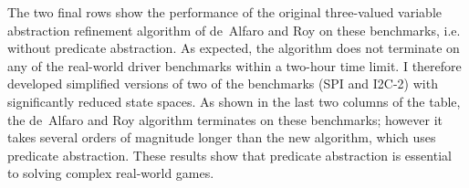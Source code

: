 The two final rows show the performance of the original three-valued variable abstraction refinement algorithm of de~Alfaro and Roy on these benchmarks, i.e. without predicate abstraction.  As expected, the algorithm does not terminate on any of the real-world driver benchmarks within a two-hour time limit.  I therefore developed simplified versions of two of the benchmarks (SPI and I2C-2) with significantly reduced state spaces.  As shown in the last two columns of the table, the de~Alfaro and Roy algorithm terminates on these benchmarks; however it takes several orders of magnitude longer than the new algorithm, which uses predicate abstraction.  These results show that predicate abstraction is essential to solving complex real-world games.


